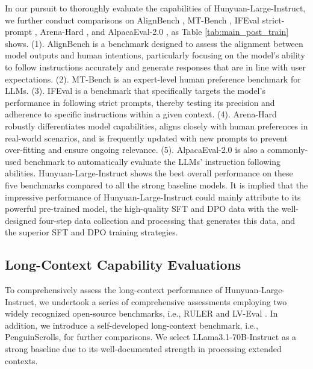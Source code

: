 \documentclass{article}
\begin{document}
In our pursuit to thoroughly evaluate the capabilities of Hunyuan-Large-Instruct, we further conduct comparisons on AlignBench \citep{liu2024alignbenchbenchmarkingchinesealignment}, MT-Bench \citep{zheng2023judgingllmasajudgemtbenchchatbot}, IFEval strict-prompt \citep{zhou2023instructionfollowingevaluationlargelanguage}, Arena-Hard \citep{li2024crowdsourceddatahighqualitybenchmarks}, and 
AlpacaEval-2.0 \citep{dubois2024lengthcontrolledalpacaevalsimpleway}, as Table \ref{tab:main_post_train} shows. (1). AlignBench is a benchmark designed to assess the alignment between model outputs and human intentions, particularly focusing on the model's ability to follow instructions accurately and generate responses that are in line with user expectations. (2). MT-Bench is an expert-level human preference benchmark for LLMs. (3). IFEval is a benchmark that specifically targets the model's performance in following strict prompts, thereby testing its precision and adherence to specific instructions within a given context. (4). Arena-Hard robustly differentiates model capabilities, aligns closely with human preferences in real-world scenarios, and is frequently updated with new prompts to prevent over-fitting and ensure ongoing relevance. (5). AlpacaEval-2.0 is also a commonly-used benchmark to automatically evaluate the LLMs' instruction following abilities. Hunyuan-Large-Instruct shows the best overall performance on these five benchmarks compared to all the strong baseline models. It is implied that the impressive performance of Hunyuan-Large-Instruct could mainly attribute to its powerful pre-trained model, the high-quality SFT and DPO data with the well-designed four-step data collection and processing that generates this data, and the superior SFT and DPO training strategies. 

\subsection{Long-Context Capability Evaluations}
To comprehensively assess the long-context performance of Hunyuan-Large-Instruct, we undertook a series of comprehensive assessments employing two widely recognized open-source benchmarks, i.e., RULER \citep{hsieh2024rulerwhatsrealcontext} and LV-Eval \citep{yuan2024lvevalbalancedlongcontextbenchmark}. In addition, we introduce a self-developed long-context benchmark, i.e., PenguinScrolls, for further comparisons. We select LLama3.1-70B-Instruct as a strong baseline due to its well-documented strength in processing extended contexts.
\end{document}
